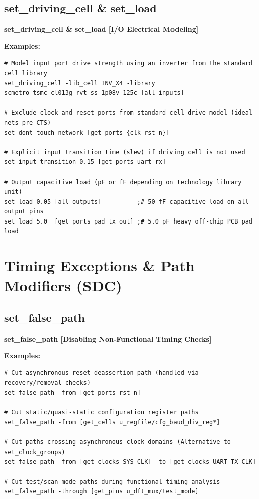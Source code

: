 \documentclass[11pt,a4paper]{article}
\newenvironment{cmdbox}[2]{%
  \begin{mdframed}[style=cmdstyle]%
  {\bfseries\sffamily\color{primary}#1 \hfill \footnotesize\color{mutedgray}[#2]}\par\vspace{3pt}%
}{%
  \end{mdframed}%
}
\begin{document}
\subsection{set\_driving\_cell \& set\_load}
\begin{cmdbox}{set\_driving\_cell \& set\_load}{I/O Electrical Modeling}
\textbf{Examples:}
\begin{lstlisting}[style=sdcstyle]
# Model input port drive strength using an inverter from the standard cell library
set_driving_cell -lib_cell INV_X4 -library scmetro_tsmc_cl013g_rvt_ss_1p08v_125c [all_inputs]

# Exclude clock and reset ports from standard cell drive model (ideal nets pre-CTS)
set_dont_touch_network [get_ports {clk rst_n}]

# Explicit input transition time (slew) if driving cell is not used
set_input_transition 0.15 [get_ports uart_rx]

# Output capacitive load (pF or fF depending on technology library unit)
set_load 0.05 [all_outputs]          ;# 50 fF capacitive load on all output pins
set_load 5.0  [get_ports pad_tx_out] ;# 5.0 pF heavy off-chip PCB pad load
\end{lstlisting}
\end{cmdbox}

\section{Timing Exceptions \& Path Modifiers (SDC)}

\subsection{set\_false\_path}
\begin{cmdbox}{set\_false\_path}{Disabling Non-Functional Timing Checks}
\textbf{Examples:}
\begin{lstlisting}[style=sdcstyle]
# Cut asynchronous reset deassertion path (handled via recovery/removal checks)
set_false_path -from [get_ports rst_n]

# Cut static/quasi-static configuration register paths
set_false_path -from [get_cells u_regfile/cfg_baud_div_reg*]

# Cut paths crossing asynchronous clock domains (Alternative to set_clock_groups)
set_false_path -from [get_clocks SYS_CLK] -to [get_clocks UART_TX_CLK]

# Cut test/scan-mode paths during functional timing analysis
set_false_path -through [get_pins u_dft_mux/test_mode]
\end{lstlisting}
\end{cmdbox}
\end{document}
